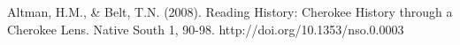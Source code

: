 

\begin{thebibliography}{99}
 Altman, H.M., \& Belt, T.N. (2008). Reading History: Cherokee History through a Cherokee Lens. Native South 1, 90-98. http://doi.org/10.1353/nso.0.0003
\end{thebibliography}
